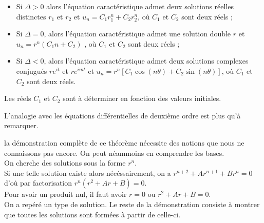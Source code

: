 \documentclass[french]{book}
\newcommand{\eit}{e^{it}}
\newcommand{\eimt}{e^{imt}}
\newcommand{\cro}[1]{[#1]}
\begin{document}
\begin{thm}
\begin{itemize}
\item Si $\Delta>0$ alors l'équation caractéristique admet deux solutions réelles distinctes $r_1$ et $r_2$ et $u_n = C_1 r_1^n + C_2 r_2^n$, où $C_1$ et $C_2$ sont deux réels ;
\item Si $\Delta=0$, alors l'équation caractéristique admet une solution double $r$ et $u_n = r^n(C_1n+C_2)$ , où $C_1$ et $C_2$ sont deux réels ;
\item Si $\Delta < 0$, alors l'équation caractéristique admet deux solutions complexes conjugués $r\eit$ et $r\eimt$ et $ u_n = r^n\cro{C_1\cos(n\theta)+C_2\sin(n\theta)} $, où $C_1$ et $C_2$ sont deux réels.
\end{itemize}
Les réels $C_1$ et $C_2$ sont à déterminer en fonction des valeurs initiales.
\end{thm}

\begin{rem}
L'analogie avec les équations différentielles de deuxième ordre est plus qu'à remarquer.
\end{rem}

\begin{demo}
la démonstration complète de ce théorème nécessite des notions que nous ne connaissons pas encore. On peut néammoins en comprendre les bases.\\
On cherche des solutions sous la forme $r^n$.\\
Si une telle solution existe alors nécéssairement, on a $r^{n+2}+Ar^{n+1}+Br^n=0$ d'où par factorisation $r^n(r^2+Ar+B)=0$.\\
Pour avoir un produit nul, il faut avoir $r=0$ ou $r^2+Ar+B=0$.\\
On a repéré un type de solution. Le reste de la démonstration consiste à montrer que toutes les solutions sont formées à partir de celle-ci.
\end{demo}
\end{document}
